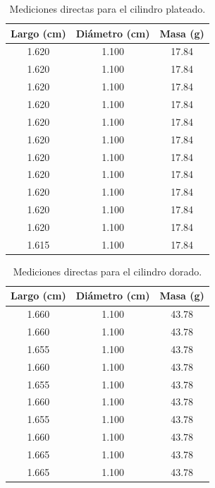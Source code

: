 \begin{table}[h!]
    \centering
    \caption{Mediciones directas para el cilindro plateado.}
    \label{tab:cilindro_plata}
    \begin{tabular}{ccc}
    \toprule
    \textbf{Largo (cm)} & \textbf{Diámetro (cm)} & \textbf{Masa (g)} \\
    \midrule
    1.620 & 1.100 & 17.84 \\
    1.620 & 1.100 & 17.84 \\
    1.620 & 1.100 & 17.84 \\
    1.620 & 1.100 & 17.84 \\
    1.620 & 1.100 & 17.84 \\
    1.620 & 1.100 & 17.84 \\
    1.620 & 1.100 & 17.84 \\
    1.620 & 1.100 & 17.84 \\
    1.620 & 1.100 & 17.84 \\
    1.620 & 1.100 & 17.84 \\
    1.620 & 1.100 & 17.84 \\
    1.615 & 1.100 & 17.84 \\
    \bottomrule
    \end{tabular}
\end{table}

\begin{table}[h!]
    \centering
    \caption{Mediciones directas para el cilindro dorado.}
    \label{tab:cilindro_dorado}
    \begin{tabular}{ccc}
    \toprule
    \textbf{Largo (cm)} & \textbf{Diámetro (cm)} & \textbf{Masa (g)} \\
    \midrule
    1.660 & 1.100 & 43.78 \\
    1.660 & 1.100 & 43.78 \\
    1.655 & 1.100 & 43.78 \\
    1.660 & 1.100 & 43.78 \\
    1.655 & 1.100 & 43.78 \\
    1.660 & 1.100 & 43.78 \\
    1.655 & 1.100 & 43.78 \\
    1.660 & 1.100 & 43.78 \\
    1.665 & 1.100 & 43.78 \\
    1.665 & 1.100 & 43.78 \\
    \bottomrule
    \end{tabular}
\end{table}

